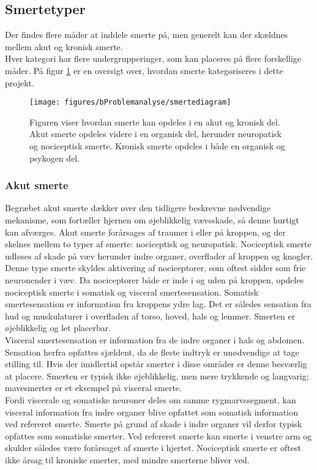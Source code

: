 \subsection{Smertetyper}
Der findes flere måder at inddele smerte på, men generelt kan der skældnes mellem akut og kronisk smerte. \\
Hver kategori har flere undergrupperinger, som kan placeres på flere forskellige måder. \citep{Giangregorio1997} På figur \ref{smertediagram} er en oversigt over, hvordan smerte kategoriseres i dette projekt.

\begin{figure}[H]
	\centering
	\texttt{[image: figures/bProblemanalyse/smertediagram]}
	\caption{Figuren viser hvordan smerte kan opdeles i en akut og kronisk del. Akut smerte opdeles videre i en organisk del, herunder neuropatisk og nociceptisk smerte. Kronisk smerte opdeles i både en organisk og psykogen del.}
	\label{smertediagram}
	\flushleft
\end{figure}

\subsubsection{Akut smerte}
Begræbet akut smerte dækker over den tidligere beskrevne nødvendige mekanisme, som fortæller hjernen om øjeblikkelig vævsskade, så denne hurtigt kan afværges. Akut smerte forårsages af traumer i eller på kroppen, og der skelnes mellem to typer af smerte: nociceptisk og neuropatisk. Nociceptisk smerte udløses af skade på væv herunder indre organer, overflader af kroppen og knogler. Denne type smerte skyldes aktivering af nociceptorer, som oftest sidder som frie neuronender i væv. Da nociceptorer både er inde i og uden på kroppen, opdeles nociceptisk smerte i somatisk og visceral smertesensation. Somatisk smertesensation er information fra kroppens ydre lag. Det er således sensation fra hud og muskulaturer i overfladen af torso, hoved, hals og lemmer. \citep{Martini2012} Smerten er øjeblikkelig og let placerbar. \\
Visceral smertesensation er information fra de indre organer i hals og abdomen. Sensation herfra opfattes sjældent, da de fleste indtryk er unødvendige at tage stilling til. Hvis der imidlertid opstår smerter i disse områder er denne besværlig at placere. Smerten er typisk ikke øjeblikkelig, men mere trykkende og langvarig; mavesmerter er et eksempel på visceral smerte. \citep{Martini2012} \\
Fordi viscerale og somatiske neuroner deles om samme rygmarvssegment, kan visceral information fra indre organer blive opfattet som somatisk information ved refereret smerte. Smerte på grund af skade i indre organer vil derfor typisk opfattes som somatiske smerter. Ved refereret smerte kan smerte i venstre arm og skulder således være forårsaget af smerte i hjertet. \citep{Martini2012} Nociceptisk smerte er oftest ikke årsag til kroniske smerter, med mindre smerterne bliver ved.\\ 

